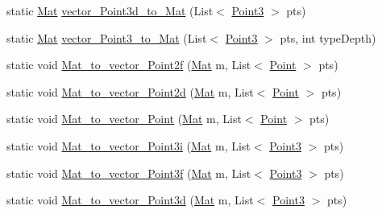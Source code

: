 \begin{DoxyCompactItemize}
\item 
static \mbox{\hyperlink{classorg_1_1opencv_1_1core_1_1_mat}{Mat}} \mbox{\hyperlink{classorg_1_1opencv_1_1utils_1_1_converters_a8c45134fa5a473b83b7d315efa8af53e}{vector\+\_\+\+Point3d\+\_\+to\+\_\+\+Mat}} (List$<$ \mbox{\hyperlink{classorg_1_1opencv_1_1core_1_1_point3}{Point3}} $>$ pts)
\item 
static \mbox{\hyperlink{classorg_1_1opencv_1_1core_1_1_mat}{Mat}} \mbox{\hyperlink{classorg_1_1opencv_1_1utils_1_1_converters_a802d4d874a5062421181a96d319e212d}{vector\+\_\+\+Point3\+\_\+to\+\_\+\+Mat}} (List$<$ \mbox{\hyperlink{classorg_1_1opencv_1_1core_1_1_point3}{Point3}} $>$ pts, int type\+Depth)
\item 
static void \mbox{\hyperlink{classorg_1_1opencv_1_1utils_1_1_converters_a259fbd328a8e8e0271a4b428376bcb37}{Mat\+\_\+to\+\_\+vector\+\_\+\+Point2f}} (\mbox{\hyperlink{classorg_1_1opencv_1_1core_1_1_mat}{Mat}} m, List$<$ \mbox{\hyperlink{classorg_1_1opencv_1_1core_1_1_point}{Point}} $>$ pts)
\item 
static void \mbox{\hyperlink{classorg_1_1opencv_1_1utils_1_1_converters_a692ad5965de5fc073596b53686e5270b}{Mat\+\_\+to\+\_\+vector\+\_\+\+Point2d}} (\mbox{\hyperlink{classorg_1_1opencv_1_1core_1_1_mat}{Mat}} m, List$<$ \mbox{\hyperlink{classorg_1_1opencv_1_1core_1_1_point}{Point}} $>$ pts)
\item 
static void \mbox{\hyperlink{classorg_1_1opencv_1_1utils_1_1_converters_ae12e7772d727b556dd5927731294a0fb}{Mat\+\_\+to\+\_\+vector\+\_\+\+Point}} (\mbox{\hyperlink{classorg_1_1opencv_1_1core_1_1_mat}{Mat}} m, List$<$ \mbox{\hyperlink{classorg_1_1opencv_1_1core_1_1_point}{Point}} $>$ pts)
\item 
static void \mbox{\hyperlink{classorg_1_1opencv_1_1utils_1_1_converters_a979f90d509573a9c7b5952d6048d7df8}{Mat\+\_\+to\+\_\+vector\+\_\+\+Point3i}} (\mbox{\hyperlink{classorg_1_1opencv_1_1core_1_1_mat}{Mat}} m, List$<$ \mbox{\hyperlink{classorg_1_1opencv_1_1core_1_1_point3}{Point3}} $>$ pts)
\item 
static void \mbox{\hyperlink{classorg_1_1opencv_1_1utils_1_1_converters_a3dcd0ca474b78a60e590b38f10f2fb0a}{Mat\+\_\+to\+\_\+vector\+\_\+\+Point3f}} (\mbox{\hyperlink{classorg_1_1opencv_1_1core_1_1_mat}{Mat}} m, List$<$ \mbox{\hyperlink{classorg_1_1opencv_1_1core_1_1_point3}{Point3}} $>$ pts)
\item 
static void \mbox{\hyperlink{classorg_1_1opencv_1_1utils_1_1_converters_a31a91079c12656b8e11959dd6f50b1f0}{Mat\+\_\+to\+\_\+vector\+\_\+\+Point3d}} (\mbox{\hyperlink{classorg_1_1opencv_1_1core_1_1_mat}{Mat}} m, List$<$ \mbox{\hyperlink{classorg_1_1opencv_1_1core_1_1_point3}{Point3}} $>$ pts)

\end{DoxyCompactItemize}
